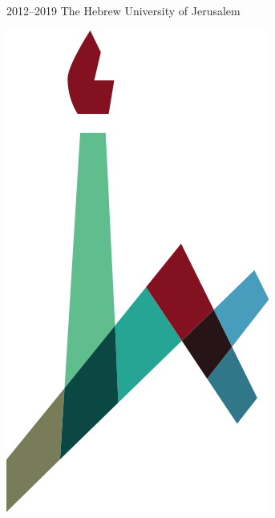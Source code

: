 \documentclass[t,xcolor={svgnames,table}]{beamer}
\begin{document}
\begin{frame}
\begin{minipage}{.7\textwidth}
2012--2019 The Hebrew University of Jerusalem
\end{minipage}
\begin{minipage}{.05\textwidth}
\includegraphics[width=\textwidth]{Hebrew_University_new_Logo_2.png}
\end{minipage}

\vfill


\end{frame}
\end{document}

